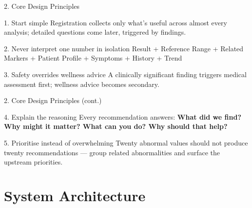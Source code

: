 \documentclass[10pt,aspectratio=169]{beamer}
\begin{document}
\begin{frame}{2. Core Design Principles}
\begin{block}{1. Start simple}
Registration collects only what's useful across almost every analysis; detailed questions come later, triggered by findings.
\end{block}
\begin{block}{2. Never interpret one number in isolation}
Result + Reference Range + Related Markers + Patient Profile + Symptoms + History + Trend
\end{block}
\begin{block}{3. Safety overrides wellness advice}
A clinically significant finding triggers medical assessment first; wellness advice becomes secondary.
\end{block}
\end{frame}

\begin{frame}{2. Core Design Principles (cont.)}
\begin{block}{4. Explain the reasoning}
Every recommendation answers: \textbf{What did we find? Why might it matter? What can you do? Why should that help?}
\end{block}
\begin{block}{5. Prioritise instead of overwhelming}
Twenty abnormal values should not produce twenty recommendations --- group related abnormalities and surface the upstream priorities.
\end{block}
\end{frame}

\section{System Architecture}
\end{document}
